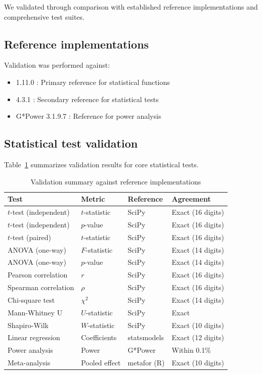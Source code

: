 \documentclass[article]{jss}
\begin{document}
We validated  through comparison with established reference implementations and comprehensive test suites.

\subsection{Reference implementations}

Validation was performed against:

\begin{itemize}
\item {} 1.11.0 \citep{virtanen2020scipy}: Primary reference for statistical functions
\item {} 4.3.1 \citep{rcore2023}: Secondary reference for statistical tests
\item G*Power 3.1.9.7 \citep{faul2007gpower}: Reference for power analysis
\end{itemize}

\subsection{Statistical test validation}

Table~\ref{tab:validation} summarizes validation results for core statistical tests.

\begin{table}[htbp]
\centering
\caption{Validation summary against reference implementations}
\label{tab:validation}
\begin{tabular}{llll}
\toprule
Test & Metric & Reference & Agreement \\
\midrule
$t$-test (independent) & $t$-statistic & SciPy & Exact (16 digits) \\
$t$-test (independent) & $p$-value & SciPy & Exact (16 digits) \\
$t$-test (paired) & $t$-statistic & SciPy & Exact (16 digits) \\
ANOVA (one-way) & $F$-statistic & SciPy & Exact (14 digits) \\
ANOVA (one-way) & $p$-value & SciPy & Exact (14 digits) \\
Pearson correlation & $r$ & SciPy & Exact (16 digits) \\
Spearman correlation & $\rho$ & SciPy & Exact (16 digits) \\
Chi-square test & $\chi^2$ & SciPy & Exact (14 digits) \\
Mann-Whitney U & $U$-statistic & SciPy & Exact \\
Shapiro-Wilk & $W$-statistic & SciPy & Exact (10 digits) \\
Linear regression & Coefficients & statsmodels & Exact (12 digits) \\
Power analysis & Power & G*Power & Within 0.1\% \\
Meta-analysis & Pooled effect & metafor (R) & Exact (10 digits) \\
\bottomrule
\end{tabular}
\end{table}
\end{document}
